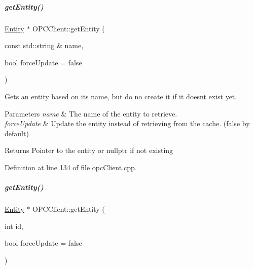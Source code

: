 \mbox{\label{group__icubclient__clients_ad0aea7a8df35f5e01f352b789ea043e1}} 
\subparagraph{\texorpdfstring{get\+Entity()}{getEntity()}\hspace{0.1cm}{\footnotesize\ttfamily [1/2]}}
{\footnotesize\ttfamily \hyperlink{group__icubclient__representations_classicubclient_1_1Entity}{Entity} $\ast$ O\+P\+C\+Client\+::get\+Entity (\begin{DoxyParamCaption}\item[{const std\+::string \&}]{name,  }\item[{bool}]{force\+Update = {\ttfamily false} }\end{DoxyParamCaption})}



Gets an entity based on its name, but do no create it if it doesn\textquotesingle{}t exist yet. 


\begin{DoxyParams}{Parameters}
{\em name} & The name of the entity to retrieve. \\
\hline
{\em force\+Update} & Update the entity instead of retrieving from the cache. (false by default) \\
\hline
\end{DoxyParams}
\begin{DoxyReturn}{Returns}
Pointer to the entity or nullptr if not existing 
\end{DoxyReturn}


Definition at line 134 of file opc\+Client.\+cpp.

\mbox{\label{group__icubclient__clients_aa7accc436612cd9cd73fb264649675ee}} 
\subparagraph{\texorpdfstring{get\+Entity()}{getEntity()}\hspace{0.1cm}{\footnotesize\ttfamily [2/2]}}
{\footnotesize\ttfamily \hyperlink{group__icubclient__representations_classicubclient_1_1Entity}{Entity} $\ast$ O\+P\+C\+Client\+::get\+Entity (\begin{DoxyParamCaption}\item[{int}]{id,  }\item[{bool}]{force\+Update = {\ttfamily false} }\end{DoxyParamCaption})}



